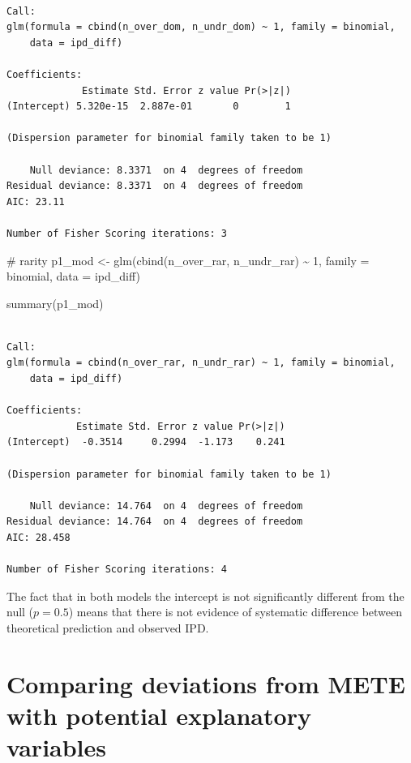 \documentclass[
  letterpaper,
  DIV=11,
  numbers=noendperiod]{scrartcl}
\newenvironment{Shaded}{\begin{snugshade}}{\end{snugshade}}
\newcommand{\AttributeTok}[1]{\textcolor[rgb]{0.40,0.45,0.13}{#1}}
\newcommand{\CommentTok}[1]{\textcolor[rgb]{0.37,0.37,0.37}{#1}}
\newcommand{\DecValTok}[1]{\textcolor[rgb]{0.68,0.00,0.00}{#1}}
\newcommand{\FunctionTok}[1]{\textcolor[rgb]{0.28,0.35,0.67}{#1}}
\newcommand{\NormalTok}[1]{\textcolor[rgb]{0.00,0.23,0.31}{#1}}
\newcommand{\OtherTok}[1]{\textcolor[rgb]{0.00,0.23,0.31}{#1}}
\newcommand{\SpecialCharTok}[1]{\textcolor[rgb]{0.37,0.37,0.37}{#1}}
\begin{document}
\begin{verbatim}

Call:
glm(formula = cbind(n_over_dom, n_undr_dom) ~ 1, family = binomial, 
    data = ipd_diff)

Coefficients:
             Estimate Std. Error z value Pr(>|z|)
(Intercept) 5.320e-15  2.887e-01       0        1

(Dispersion parameter for binomial family taken to be 1)

    Null deviance: 8.3371  on 4  degrees of freedom
Residual deviance: 8.3371  on 4  degrees of freedom
AIC: 23.11

Number of Fisher Scoring iterations: 3
\end{verbatim}

\begin{Shaded}
\begin{Highlighting}[]
\CommentTok{\# rarity}
\NormalTok{p1\_mod }\OtherTok{\textless{}{-}} \FunctionTok{glm}\NormalTok{(}\FunctionTok{cbind}\NormalTok{(n\_over\_rar, n\_undr\_rar) }\SpecialCharTok{\textasciitilde{}} \DecValTok{1}\NormalTok{, }
              \AttributeTok{family =}\NormalTok{ binomial, }\AttributeTok{data =}\NormalTok{ ipd\_diff)}

\FunctionTok{summary}\NormalTok{(p1\_mod)}
\end{Highlighting}
\end{Shaded}

\begin{verbatim}

Call:
glm(formula = cbind(n_over_rar, n_undr_rar) ~ 1, family = binomial, 
    data = ipd_diff)

Coefficients:
            Estimate Std. Error z value Pr(>|z|)
(Intercept)  -0.3514     0.2994  -1.173    0.241

(Dispersion parameter for binomial family taken to be 1)

    Null deviance: 14.764  on 4  degrees of freedom
Residual deviance: 14.764  on 4  degrees of freedom
AIC: 28.458

Number of Fisher Scoring iterations: 4
\end{verbatim}

The fact that in both models the intercept is not significantly
different from the null (\(p = 0.5\)) means that there is not evidence
of systematic difference between theoretical prediction and observed
IPD.

\section{Comparing deviations from METE with potential explanatory
variables}\label{comparing-deviations-from-mete-with-potential-explanatory-variables}
\end{document}

